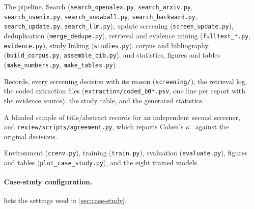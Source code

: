 \begingroup\sloppy
\begin{description}[leftmargin=0pt]
  \item[\texttt{review/scripts/}] The pipeline. Search (\texttt{search\_openalex.py}, \texttt{search\_arxiv.py}, \texttt{search\_usenix.py}, \texttt{search\_snowball.py}, \texttt{search\_backward.py}, \texttt{search\_update.py}, \texttt{search\_llm.py}), update screening (\texttt{screen\_update.py}), deduplication (\texttt{merge\_dedupe.py}), retrieval and evidence mining (\texttt{fulltext\_*.py}, \texttt{evidence.py}), study linking (\texttt{studies.py}), corpus and bibliography (\texttt{build\_corpus.py}, \texttt{assemble\_bib.py}), and statistics, figures and tables (\texttt{make\_numbers.py}, \texttt{make\_tables.py}).
  \item[\texttt{review/data/}] Records, every screening decision with its reason (\texttt{screening/}), the retrieval log, the coded extraction files (\texttt{extraction/coded\_b0*.psv}, one line per report with the evidence source), the study table, and the generated statistics.
  \item[\texttt{review/data/screening/second\_screener/}] A blinded sample of title/abstract records for an independent second screener, and \texttt{review/scripts/agreement.py}, which reports Cohen's $\kappa$~\cite{cohen1960kappa} against the original decisions.
  \item[\texttt{case\_study/}] Environment (\texttt{ccenv.py}), training (\texttt{train.py}), evaluation (\texttt{evaluate.py}), figures and tables (\texttt{plot\_case\_study.py}), and the eight trained models.
\end{description}
\endgroup

\paragraph{Case-study configuration.}  lists the settings used in \cref{sec:case-study}.

